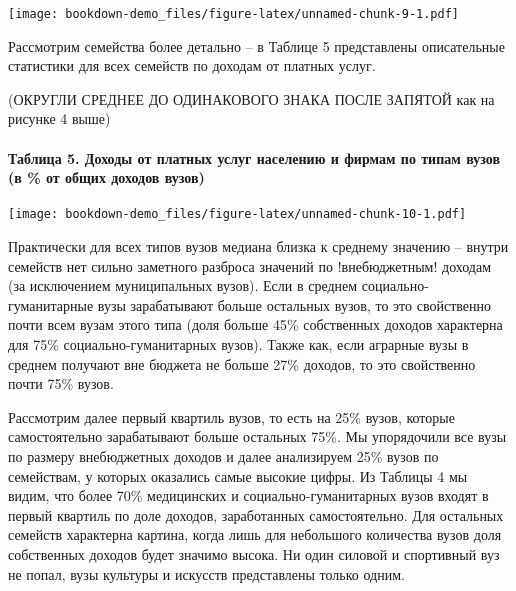 \documentclass[]{book}
\let\oldparagraph\paragraph
\renewcommand{\paragraph}[1]{\oldparagraph{#1}\mbox{}}
\begin{document}
\texttt{[image: bookdown-demo\_files/figure-latex/unnamed-chunk-9-1.pdf]}

Рассмотрим семейства более детально -- в Таблице 5 представлены описательные статистики для всех семейств по доходам от платных услуг.

(ОКРУГЛИ СРЕДНЕЕ ДО ОДИНАКОВОГО ЗНАКА ПОСЛЕ ЗАПЯТОЙ как на рисунке 4 выше)

\hypertarget{ux442ux430ux431ux43bux438ux446ux430-5.-ux434ux43eux445ux43eux434ux44b-ux43eux442-ux43fux43bux430ux442ux43dux44bux445-ux443ux441ux43bux443ux433-ux43dux430ux441ux435ux43bux435ux43dux438ux44e-ux438-ux444ux438ux440ux43cux430ux43c-ux43fux43e-ux442ux438ux43fux430ux43c-ux432ux443ux437ux43eux432-ux432-ux43eux442-ux43eux431ux449ux438ux445-ux434ux43eux445ux43eux434ux43eux432-ux432ux443ux437ux43eux432}{%
\paragraph{Таблица 5. Доходы от платных услуг населению и фирмам по типам вузов (в \% от общих доходов вузов)}\label{ux442ux430ux431ux43bux438ux446ux430-5.-ux434ux43eux445ux43eux434ux44b-ux43eux442-ux43fux43bux430ux442ux43dux44bux445-ux443ux441ux43bux443ux433-ux43dux430ux441ux435ux43bux435ux43dux438ux44e-ux438-ux444ux438ux440ux43cux430ux43c-ux43fux43e-ux442ux438ux43fux430ux43c-ux432ux443ux437ux43eux432-ux432-ux43eux442-ux43eux431ux449ux438ux445-ux434ux43eux445ux43eux434ux43eux432-ux432ux443ux437ux43eux432}}

\texttt{[image: bookdown-demo\_files/figure-latex/unnamed-chunk-10-1.pdf]}

Практически для всех типов вузов медиана близка к среднему значению -- внутри семейств нет сильно заметного разброса значений по !внебюджетным! доходам (за исключением муниципальных вузов). Если в среднем социально-гуманитарные вузы зарабатывают больше остальных вузов, то это свойственно почти всем вузам этого типа (доля больше 45\% собственных доходов характерна для 75\% социально-гуманитарных вузов). Также как, если аграрные вузы в среднем получают вне бюджета не больше 27\% доходов, то это свойственно почти 75\% вузов.

Рассмотрим далее первый квартиль вузов, то есть на 25\% вузов, которые самостоятельно зарабатывают больше остальных 75\%. Мы упорядочили все вузы по размеру внебюджетных доходов и далее анализируем 25\% вузов по семействам, у которых оказались самые высокие цифры. Из Таблицы 4 мы видим, что более 70\% медицинских и социально-гуманитарных вузов входят в первый квартиль по доле доходов, заработанных самостоятельно. Для остальных семейств характерна картина, когда лишь для небольшого количества вузов доля собственных доходов будет значимо высока. Ни один силовой и спортивный вуз не попал, вузы культуры и искусств представлены только одним.
\end{document}
